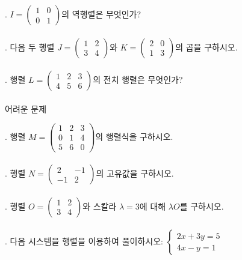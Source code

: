 \documentclass[fleqn]{article}
\begin{document}
. \( I = \begin{pmatrix} 1 & 0 \\ 0 & 1 \end{pmatrix} \)의 역행렬은 무엇인가? \\\\

. 다음 두 행렬 \( J = \begin{pmatrix} 1 & 2 \\ 3 & 4 \end{pmatrix} \)와 \( K = \begin{pmatrix} 2 & 0 \\ 1 & 3 \end{pmatrix} \)의 곱을 구하시오. \\\\

. 행렬 \( L = \begin{pmatrix} 1 & 2 & 3 \\ 4 & 5 & 6 \end{pmatrix} \)의 전치 행렬은 무엇인가? \\\\

 어려운 문제

. 행렬 \( M = \begin{pmatrix} 1 & 2 & 3 \\ 0 & 1 & 4 \\ 5 & 6 & 0 \end{pmatrix} \)의 행렬식을 구하시오. \\\\

. 행렬 \( N = \begin{pmatrix} 2 & -1 \\ -1 & 2 \end{pmatrix} \)의 고유값을 구하시오. \\\\

. 행렬 \( O = \begin{pmatrix} 1 & 2 \\ 3 & 4 \end{pmatrix} \)와 스칼라 \( \lambda = 3 \)에 대해 \( \lambda O \)를 구하시오. \\\\

. 다음 시스템을 행렬을 이용하여 풀이하시오:  
\(\begin{cases} 2x + 3y = 5 \\ 4x - y = 1 \end{cases}\) \\\\
\end{document}
